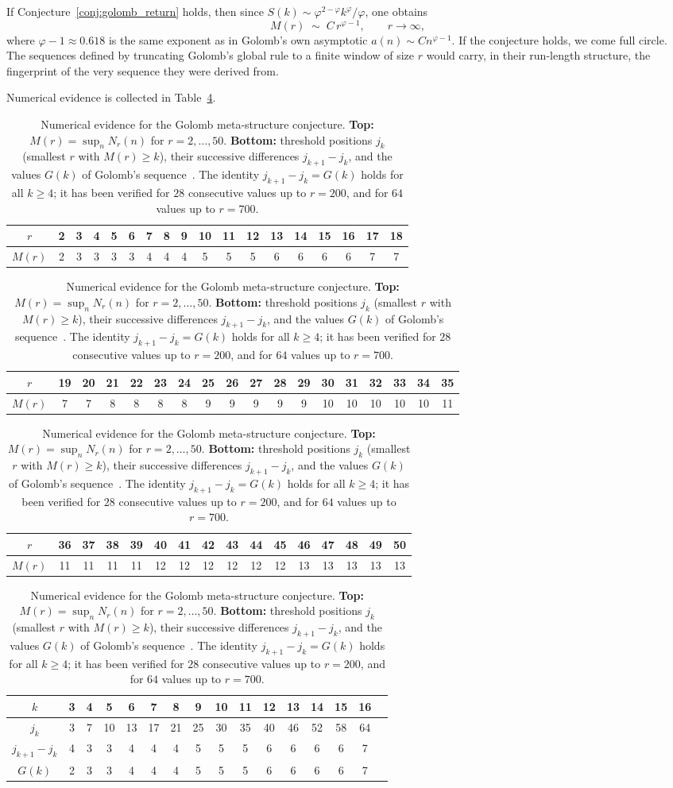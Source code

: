 \documentclass[12pt]{article}
\theoremstyle{definition}
\theoremstyle{remark}
\begin{document}
If Conjecture~\ref{conj:golomb_return} holds, then since
$S(k)\sim \varphi^{2-\varphi}k^\varphi/\varphi$, one obtains
\[
  M(r) \;\sim\; C\,r^{\varphi-1}, \qquad r\to\infty,
\]
where $\varphi-1\approx 0.618$ is the same exponent as in
Golomb's own asymptotic $a(n)\sim C n^{\varphi-1}$.
If the conjecture holds, we come full circle. The sequences defined by
truncating Golomb's global rule to a finite window of size $r$ would carry,
in their run-length structure, the fingerprint of the very sequence they
were derived from.

Numerical evidence is collected in Table~\ref{tab:golomb_meta}.

\begin{table}[ht]
\centering
\renewcommand{\arraystretch}{1.35}
\caption{Numerical evidence for the Golomb meta-structure conjecture.
\textbf{Top:} $M(r)=\sup_n N_r(n)$ for $r=2,\ldots,50$.
\textbf{Bottom:} threshold positions $j_k$ (smallest $r$ with $M(r)\ge k$),
their successive differences $j_{k+1}-j_k$, and the values $G(k)$ of Golomb's
sequence~\cite{Golomb66}.
The identity $j_{k+1}-j_k = G(k)$ holds for all $k\ge 4$;
it has been verified for $28$ consecutive values up to $r=200$,
and for $64$ values up to $r=700$.}
\label{tab:golomb_meta}
\smallskip

{\small
\begin{tabular}{c|ccccccccccccccccc}
$r$    &  2& 3& 4& 5& 6& 7& 8& 9&10&11&12&13&14&15&16&17&18 \\\hline
$M(r)$ &  2& 3& 3& 3& 3& 4& 4& 4& 5& 5& 5& 6& 6& 6& 6& 7& 7
\end{tabular}

\smallskip
\begin{tabular}{c|ccccccccccccccccc}
$r$    & 19&20&21&22&23&24&25&26&27&28&29&30&31&32&33&34&35 \\\hline
$M(r)$ &  7& 7& 8& 8& 8& 8& 9& 9& 9& 9& 9&10&10&10&10&10&11
\end{tabular}

\smallskip
\begin{tabular}{c|ccccccccccccccc}
$r$    & 36&37&38&39&40&41&42&43&44&45&46&47&48&49&50 \\\hline
$M(r)$ & 11&11&11&11&12&12&12&12&12&12&13&13&13&13&13
\end{tabular}
}

\bigskip

{\small
\begin{tabular}{c|c|cccccccccccccc}
$k$             &  3 &  4 &  5 &  6 &  7 &  8 &  9 & 10 & 11 & 12 & 13 & 14 & 15 & 16 \\\hline
$j_k$           &  3 &  7 & 10 & 13 & 17 & 21 & 25 & 30 & 35 & 40 & 46 & 52 & 58 & 64 \\\hline
$j_{k+1}{-}j_k$ &  4 &  3 &  3 &  4 &  4 &  4 &  5 &  5 &  5 &  6 &  6 &  6 &  6 &  7 \\\hline
$G(k)$          &  2 &  3 &  3 &  4 &  4 &  4 &  5 &  5 &  5 &  6 &  6 &  6 &  6 &  7 \\
\end{tabular}

}
\end{table}
\end{document}

